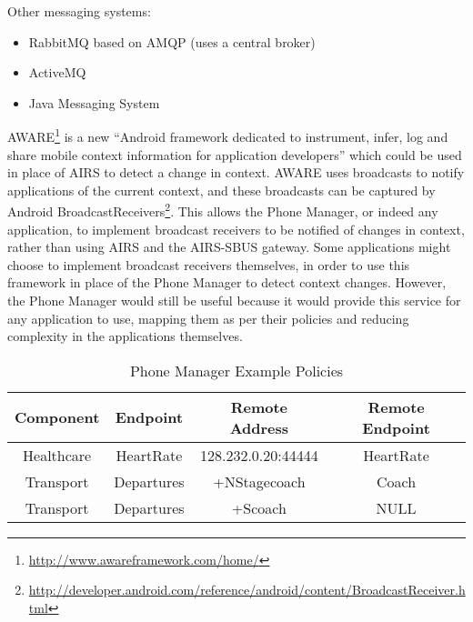 \documentclass[12pt,twoside,notitlepage]{report}
\begin{document}
Other messaging systems:
\begin{itemize}

\item RabbitMQ based on AMQP (uses a central broker)
\item ActiveMQ
\item Java Messaging System
\end{itemize}

AWARE\footnote{\url{http://www.awareframework.com/home/}} is a new ``Android framework dedicated to instrument, infer, log and share mobile context information for application developers'' which could be used in place of AIRS to detect a change in context.
AWARE uses broadcasts to notify applications of the current context, and these broadcasts can be captured by Android BroadcastReceivers\footnote{\url{http://developer.android.com/reference/android/content/BroadcastReceiver.html}}. This allows the Phone Manager, or indeed any application, to implement broadcast receivers to be notified of changes in context, rather than using AIRS and the AIRS-SBUS gateway. 
Some applications might choose to implement broadcast receivers themselves, in order to use this framework in place of the Phone Manager to detect context changes.
However, the Phone Manager would still be useful because it would provide this service for any application to use, mapping them as per their policies and reducing complexity in the applications themselves.

\begin{table}[tbh]
\centering

\begin{tabular}{c c c c}
\hline\hline
Component & Endpoint & Remote Address & Remote Endpoint \\
\hline

Healthcare & HeartRate & 128.232.0.20:44444 & HeartRate \\
Transport & Departures & +NStagecoach & Coach \\
Transport & Departures & +Scoach & NULL \\

\hline
\end{tabular}

\caption{Phone Manager Example Policies}
\label{tab:example_policies}
\end{table}
\end{document}
